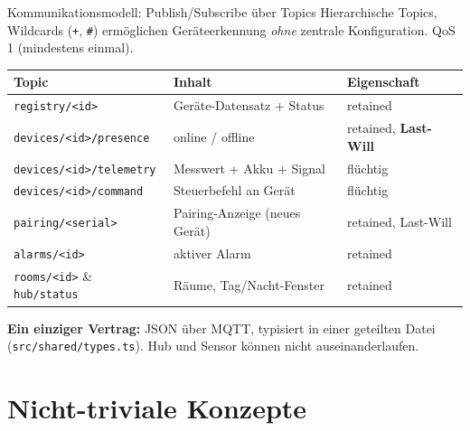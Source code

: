 \documentclass[aspectratio=169,11pt]{beamer}
\begin{document}
\begin{frame}{Kommunikationsmodell: Publish/Subscribe \"uber Topics}
  Hierarchische Topics, Wildcards (\texttt{+}, \texttt{\#}) erm\"oglichen Ger\"ateerkennung
  \emph{ohne} zentrale Konfiguration. QoS\,1 (mindestens einmal).

  \vspace{0.6em}
  \begin{center}
  \footnotesize
  \begin{tabular}{@{}l l l@{}}
    \toprule
    \textbf{Topic} & \textbf{Inhalt} & \textbf{Eigenschaft} \\
    \midrule
    \texttt{registry/<id>}            & Ger\"ate-Datensatz + Status    & retained \\
    \texttt{devices/<id>/presence}    & online / offline               & retained, \textbf{Last-Will} \\
    \texttt{devices/<id>/telemetry}   & Messwert + Akku + Signal       & fl\"uchtig \\
    \texttt{devices/<id>/command}     & Steuerbefehl an Ger\"at        & fl\"uchtig \\
    \texttt{pairing/<serial>}         & Pairing-Anzeige (neues Ger\"at)& retained, Last-Will \\
    \texttt{alarms/<id>}              & aktiver Alarm                  & retained \\
    \texttt{rooms/<id>} \& \texttt{hub/status} & R\"aume, Tag/Nacht-Fenster & retained \\
    \bottomrule
  \end{tabular}
  \end{center}

  \vspace{0.6em}
  {\small \textbf{Ein einziger Vertrag:} JSON \"uber MQTT, typisiert in einer geteilten
  Datei (\texttt{src/shared/types.ts}). Hub und Sensor k\"onnen nicht auseinanderlaufen.}
\end{frame}

\section{Nicht-triviale Konzepte}
\end{document}

